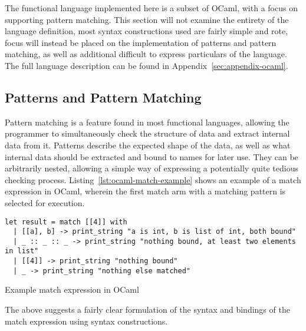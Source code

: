 \documentclass{kththesis}
\begin{document}
The functional language implemented here is a subset of OCaml, with a focus on supporting pattern matching. This section will not examine the entirety of the language definition, most syntax constructions used are fairly simple and rote, focus will instead be placed on the implementation of patterns and pattern matching, as well as additional difficult to express particulars of the language. The full language description can be found in Appendix~\ref{sec:appendix-ocaml}.

\subsection{Patterns and Pattern Matching}



Pattern matching is a feature found in most functional languages, allowing the programmer to simultaneously check the structure of data and extract internal data from it. Patterns describe the expected shape of the data, as well as what internal data should be extracted and bound to names for later use. They can be arbitrarily nested, allowing a simple way of expressing a potentially quite tedious checking process. Listing~\ref{lst:ocaml-match-example} shows an example of a match expression in OCaml, wherein the first match arm with a matching pattern is selected for execution.

\begin{listing}[ht]
\begin{verbatim}
let result = match [[4]] with
  | [[a], b] -> print_string "a is int, b is list of int, both bound"
  | _ :: _ :: _ -> print_string "nothing bound, at least two elements in list"
  | [[4]] -> print_string "nothing bound"
  | _ -> print_string "nothing else matched"
\end{verbatim}
\caption{Example match expression in OCaml}
\label{lst:ocaml-match-example}
\end{listing}

The above suggests a fairly clear formulation of the syntax and bindings of the match expression using syntax constructions.
\end{document}
